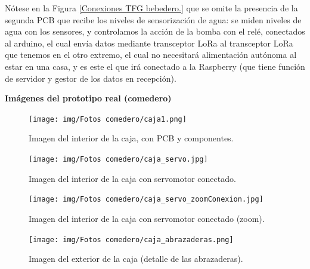 \documentclass[12pt]{article}
\begin{document}
	\noindent Nótese en la Figura \ref{Conexiones TFG bebedero.} que se omite la presencia de la segunda PCB que recibe los niveles de sensorización de agua: se miden niveles de agua con los sensores, y controlamos la acción de la bomba con el relé, conectados al arduino, el cual envía datos mediante transceptor LoRa al transceptor LoRa que tenemos en el otro extremo, el cual no necesitará alimentación autónoma al estar en una casa, y es este el que irá conectado a la Raspberry (que tiene función de servidor y gestor de los datos en recepción). \\
	
	\pagebreak
	
	\noindent \textbf{Imágenes del prototipo real (comedero)} \\
	
	\begin{figure}[h]
		\begin{center}
			\texttt{[image: img/Fotos comedero/caja1.png]}
			\caption{Imagen del interior de la caja, con PCB y componentes. }
			\label{Prototipo: caja1}
		\end{center}
	\end{figure}
	
	\pagebreak
	
	\begin{figure}[h]
		\begin{center}
			\texttt{[image: img/Fotos comedero/caja\_servo.jpg]}
			\caption{Imagen del interior de la caja con servomotor conectado.}
			\label{Prototipo: caja con servo}
		\end{center}
	\end{figure}

	\pagebreak

	\begin{figure}[h]
		\begin{center}
			\texttt{[image: img/Fotos comedero/caja\_servo\_zoomConexion.jpg]}
			\caption{Imagen del interior de la caja con servomotor conectado (zoom).}
			\label{Prototipo: caja con servo (zoom)}
		\end{center}
	\end{figure}
	
	\pagebreak

	\begin{figure}[h]
		\begin{center}
			\texttt{[image: img/Fotos comedero/caja\_abrazaderas.png]}
			\caption{Imagen del exterior de la caja (detalle de las abrazaderas).}
			\label{Prototipo: caja con abrazaderas (detalle)}
		\end{center}
	\end{figure}
\end{document}
